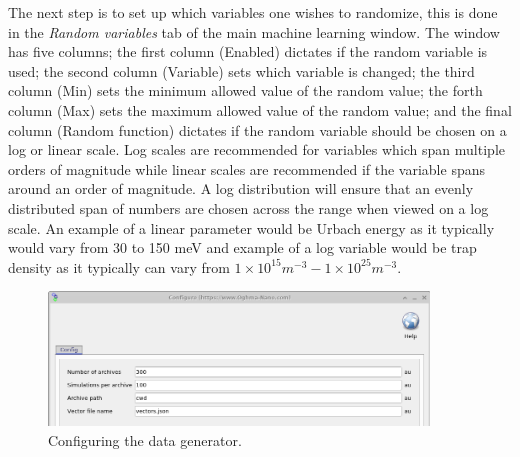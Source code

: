 The next step is to set up which variables one wishes to randomize, this is done in the \emph{Random variables} tab of the main machine learning window. The window has five columns; the first column (Enabled) dictates if the random variable is used; the second column (Variable) sets which variable is changed; the third column (Min) sets the minimum allowed value of the random value; the forth column (Max) sets the maximum allowed value of the random value; and the final column (Random function) dictates if the random variable should be chosen on a log or linear scale. Log scales are recommended for variables which span multiple orders of magnitude while linear scales are recommended if the variable spans around an order of magnitude. A log distribution will ensure that an evenly distributed span of numbers are chosen across the range when viewed on a log scale. An example of a linear parameter would be Urbach energy as it typically would vary from 30 to 150 meV and example of a log variable would be trap density as it typically can vary from $1 \times 10^{15} m^{-3} - 1 \times 10^{25} m^{-3}$. 

\begin{figure}
\centering
\includegraphics[width=0.9\textwidth,height=0.35\textwidth]{./images/ml/settings.png}
\caption{Configuring the data generator.}
\label{fig:ml_settings}
\end{figure}

